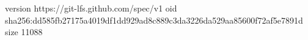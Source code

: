 version https://git-lfs.github.com/spec/v1
oid sha256:dd585fb27175a4019df1dd929ad8c889c3da3226da529aa85600f72af5e7891d
size 11088
